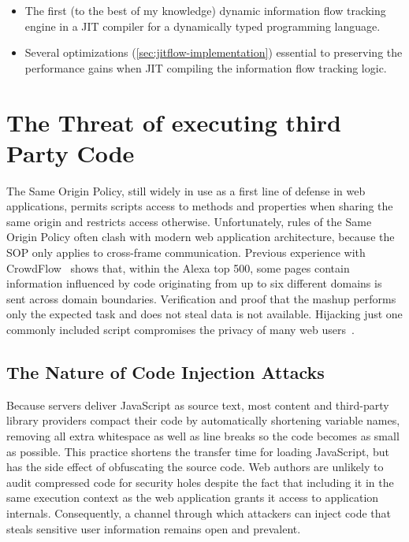 \begin{itemize}

\item The first (to the best of my knowledge) dynamic information flow tracking engine in a JIT compiler for a dynamically typed programming language.

\item Several optimizations (\autoref{sec:jitflow-implementation}) essential to preserving the performance gains when JIT compiling the information flow tracking logic.

\end{itemize}

\section{The Threat of executing third Party Code}
\label{sec:jitflow-thirdpartycode}

The Same Origin Policy, still widely in use as a first line of defense in web applications, permits scripts access to methods and properties when sharing the same origin and restricts access otherwise.
Unfortunately, rules of the Same Origin Policy often clash with modern web application architecture, because the SOP only applies to cross-frame communication.
Previous experience with CrowdFlow~\cite{kerschbaumer.etal+13} shows that, within the Alexa top 500, some pages contain information influenced by code originating from up to six different domains is sent across domain boundaries.
Verification and proof that the mashup performs only the expected task and does not steal data is not available.
Hijacking just one commonly included script compromises the privacy of many web users~\cite{nikiforakis.etal+12}.

\subsection{The Nature of Code Injection Attacks}
\label{sec:jitflow-codeinjection}

Because servers deliver JavaScript as source text, most content and third-party library providers compact their code by automatically shortening variable names, removing all extra whitespace as well as line breaks so the code becomes as small as possible.
This practice shortens the transfer time for loading JavaScript, but has the side effect of obfuscating the source code.
Web authors are unlikely to audit compressed code for security holes despite the fact that including it in the same execution context as the web application grants it access to application internals.
Consequently, a channel through which attackers can inject code that steals sensitive user information remains open and prevalent.

